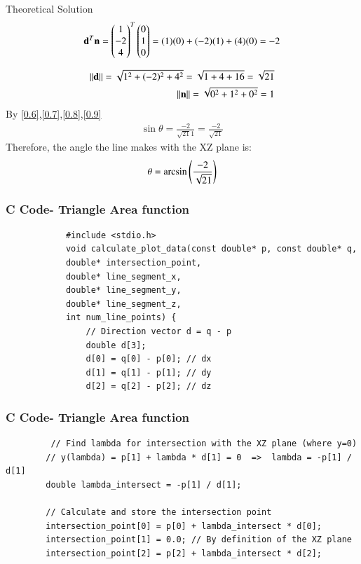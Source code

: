 \documentclass{beamer}
\begin{document}
\begin{frame}{Theoretical Solution}
\begin{align}
	\mathbf{d}^T\mathbf{n} = \begin{pmatrix}1 \\ -2 \\ 4\end{pmatrix}^T\begin{pmatrix}0 \\ 1 \\ 0\end{pmatrix} = (1)(0) + (-2)(1) + (4)(0) = -2 \label{0.7}
\end{align}

\begin{align}
	\left\lVert\mathbf{d}\right\rVert = \sqrt{1^2 + (-2)^2 + 4^2} = \sqrt{1 + 4 + 16} = \sqrt{21} \label{0.8} \\ 
	\left\lVert\mathbf{n}\right\rVert = \sqrt{0^2 + 1^2 + 0^2} = 1 \label{0.9}
\end{align}
By \eqref{0.6},\eqref{0.7},\eqref{0.8},\eqref{0.9}
\begin{align}
	\sin\theta = \frac{-2}{\sqrt{21}1} = \frac{-2}{\sqrt{21}}
\end{align}
Therefore, the angle the line makes with the XZ plane is:
\begin{align}
	\theta = \arcsin\left(\frac{-2}{\sqrt{21}}\right)
\end{align}
\end{frame}
	\begin{frame}[fragile]
		\frametitle{C Code- Triangle Area function }
		
		\begin{lstlisting}
			#include <stdio.h>
			void calculate_plot_data(const double* p, const double* q,
			double* intersection_point,
			double* line_segment_x,
			double* line_segment_y,
			double* line_segment_z,
			int num_line_points) {
				// Direction vector d = q - p
				double d[3];
				d[0] = q[0] - p[0]; // dx
				d[1] = q[1] - p[1]; // dy
				d[2] = q[2] - p[2]; // dz
		\end{lstlisting}
	\end{frame}
	\begin{frame}[fragile]
		\frametitle{C Code- Triangle Area function }
		
		\begin{lstlisting}
		 // Find lambda for intersection with the XZ plane (where y=0)
		// y(lambda) = p[1] + lambda * d[1] = 0  =>  lambda = -p[1] / d[1]
		double lambda_intersect = -p[1] / d[1];
		
		// Calculate and store the intersection point
		intersection_point[0] = p[0] + lambda_intersect * d[0];
		intersection_point[1] = 0.0; // By definition of the XZ plane
		intersection_point[2] = p[2] + lambda_intersect * d[2];
		
			\end{lstlisting}
		\end{frame}
\end{document}
